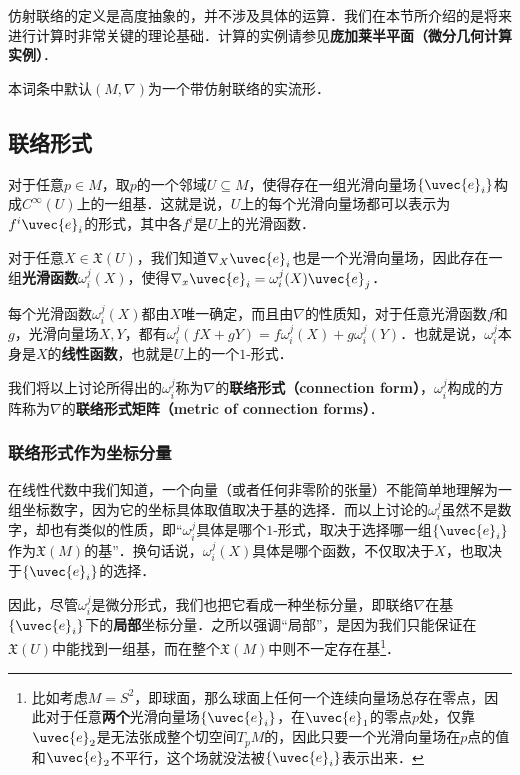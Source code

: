 

仿射联络的定义是高度抽象的，并不涉及具体的运算．我们在本节所介绍的是将来进行计算时非常关键的理论基础．计算的实例请参见\textbf{庞加莱半平面（微分几何计算实例）}．

本词条中默认$(M, \nabla)$为一个带仿射联络的实流形．

\subsection{联络形式}

对于任意$p\in M$，取$p$的一个邻域$U\subseteq M$，使得存在一组光滑向量场$\{\uvec{e}_i\}$构成$C^{\infty}(U)$上的一组基．这就是说，$U$上的每个光滑向量场都可以表示为$f^i\uvec{e}_i$的形式，其中各$f^i$是$U$上的光滑函数．

对于任意$X\in\mathfrak{X}(U)$，我们知道$\nabla_X\uvec{e}_i$也是一个光滑向量场，因此存在一组\textbf{光滑函数}$\omega^j_i(X)$，使得$\nabla_x\uvec{e}_i=\omega^j_i(X)\uvec{e}_j$．

每个光滑函数$\omega^j_i(X)$都由$X$唯一确定，而且由$\nabla$的性质知，对于任意光滑函数$f$和$g$，光滑向量场$X, Y$，都有$\omega^j_i(fX+gY)=f\omega^j_i(X)+g\omega^j_i(Y)$．也就是说，$\omega^j_i$本身是$X$的\textbf{线性函数}，也就是$U$上的一个$1$-形式．

我们将以上讨论所得出的$\omega^j_i$称为$\nabla$的\textbf{联络形式（connection form）}，$\omega^j_i$构成的方阵称为$\nabla$的\textbf{联络形式矩阵（metric of connection forms）}．

\subsubsection{联络形式作为坐标分量}

在线性代数中我们知道，一个向量（或者任何非零阶的张量）不能简单地理解为一组坐标数字，因为它的坐标具体取值取决于基的选择．而以上讨论的$\omega^j_i$虽然不是数字，却也有类似的性质，即“$\omega^j_i$具体是哪个$1$-形式，取决于选择哪一组$\{\uvec{e}_i\}$作为$\mathfrak{X}(M)$的基”．换句话说，$\omega^j_i(X)$具体是哪个函数，不仅取决于$X$，也取决于$\{\uvec{e}_i\}$的选择．

因此，尽管$\omega_i^j$是微分形式，我们也把它看成一种坐标分量，即联络$\nabla$在基$\{\uvec{e}_i\}$下的\textbf{局部}坐标分量．之所以强调“局部”，是因为我们只能保证在$\mathfrak{X}(U)$中能找到一组基，而在整个$\mathfrak{X}(M)$中则不一定存在基\footnote{比如考虑$M=S^2$，即球面，那么球面上任何一个连续向量场总存在零点，因此对于任意\textbf{两个}光滑向量场$\{\uvec{e}_i\}$，在$\uvec{e}_1$的零点$p$处，仅靠$\uvec{e}_2$是无法张成整个切空间$T_pM$的，因此只要一个光滑向量场在$p$点的值和$\uvec{e}_2$不平行，这个场就没法被$\{\uvec{e}_i\}$表示出来．}．

